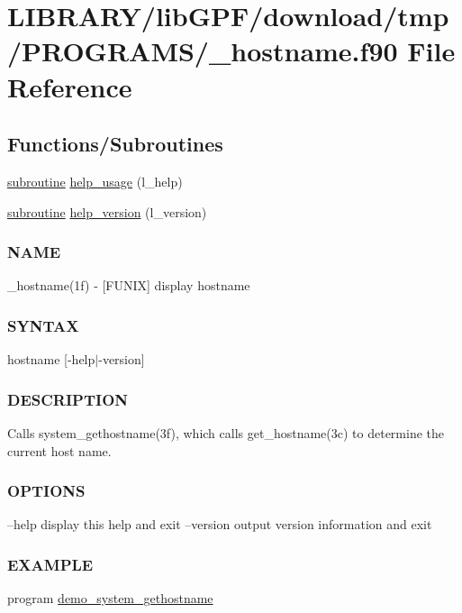 \hypertarget{__hostname_8f90}{}\section{L\+I\+B\+R\+A\+R\+Y/lib\+G\+P\+F/download/tmp/\+P\+R\+O\+G\+R\+A\+M\+S/\+\_\+hostname.f90 File Reference}
\label{__hostname_8f90}
\subsection*{Functions/\+Subroutines}
\begin{DoxyCompactItemize}
\item 
\hyperlink{M__stopwatch_83_8txt_acfbcff50169d691ff02d4a123ed70482}{subroutine} \hyperlink{__hostname_8f90_a3e09a3b52ee8fb04eeb93fe5761626a8}{help\+\_\+usage} (l\+\_\+help)
\item 
\hyperlink{M__stopwatch_83_8txt_acfbcff50169d691ff02d4a123ed70482}{subroutine} \hyperlink{__hostname_8f90_a39c21619b08a3c22f19e2306efd7f766}{help\+\_\+version} (l\+\_\+version)
\begin{DoxyCompactList}\small\item\em \subsubsection*{N\+A\+ME}

\+\_\+hostname(1f) -\/ \mbox{[}F\+U\+N\+IX\mbox{]} display hostname \subsubsection*{S\+Y\+N\+T\+AX}

hostname \mbox{[}-\/help$\vert$-\/version\mbox{]} \subsubsection*{D\+E\+S\+C\+R\+I\+P\+T\+I\+ON}

Calls system\+\_\+gethostname(3f), which calls get\+\_\+hostname(3c) to determine the current host name. \subsubsection*{O\+P\+T\+I\+O\+NS}

--help display this help and exit --version output version information and exit \subsubsection*{E\+X\+A\+M\+P\+LE}\end{DoxyCompactList}\item 
program \hyperlink{__hostname_8f90_a8cf8b2c2d1597761d376d337686d3667}{demo\+\_\+system\+\_\+gethostname}
\end{DoxyCompactItemize}


